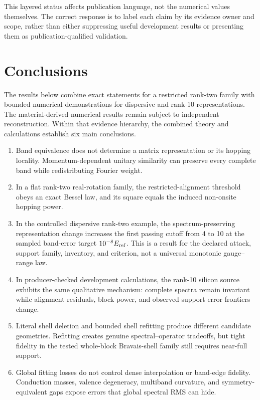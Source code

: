 \documentclass[11pt]{article}
\theoremstyle{definition}
\begin{document}
This layered status affects publication language, not the numerical values themselves.
The correct response is to label each claim by its evidence owner and scope, rather than
either suppressing useful development results or presenting them as publication-qualified
validation.

\section{Conclusions}

The results below combine exact statements for a restricted rank-two family with
bounded numerical demonstrations for dispersive and rank-10 representations.  The
material-derived numerical results remain subject to independent reconstruction.
Within that evidence hierarchy, the combined theory and calculations establish six
main conclusions.

\begin{enumerate}[leftmargin=2em]
 \item Band equivalence does not determine a matrix representation or its hopping
 locality.  Momentum-dependent unitary similarity can preserve every complete band
 while redistributing Fourier weight.
 \item In a flat rank-two real-rotation family, the restricted-alignment threshold obeys
 an exact Bessel law, and its square equals the induced non-onsite hopping power.
 \item In the controlled dispersive rank-two example, the spectrum-preserving
 representation change increases the first passing cutoff from 4 to 10 at the sampled
 band-error target $10^{-8}E_{\rm ref}$.  This is a result for the declared attack,
 support family, inventory, and criterion, not a universal monotonic gauge--range law.
 \item In producer-checked development calculations, the rank-10 silicon source exhibits
 the same qualitative mechanism: complete spectra remain invariant while alignment
 residuals, block power, and observed support-error frontiers change.
 \item Literal shell deletion and bounded shell refitting produce different candidate
 geometries.  Refitting creates genuine spectral--operator tradeoffs, but tight fidelity
 in the tested whole-block Bravais-shell family still requires near-full support.
 \item Global fitting losses do not control dense interpolation or band-edge fidelity.
 Conduction masses, valence degeneracy, multiband curvature, and symmetry-equivalent
 gaps expose errors that global spectral RMS can hide.
\end{enumerate}
\end{document}
